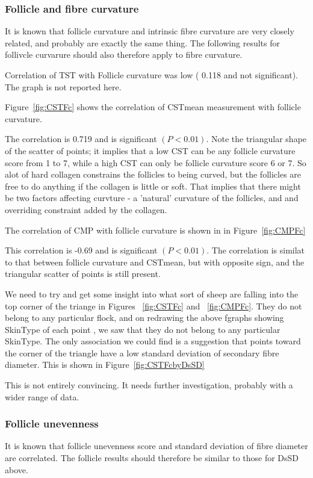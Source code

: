 \documentclass[titlepage]{article}  %
\begin{document}
\subsubsection{Follicle and fibre curvature}
It is known that follicle curvature and intrinsic fibre curvature are very closely related, and probably are exactly the same thing. The following results for follivcle curvarure should also therefore apply to fibre curvature.

Correlation of TST with Follicle curvature was low ( 0.118 and not significant). The graph is not reported here.

Figure~\ref{fig:CSTFc} shows the correlation of CSTmean measurement with follicle curvature. 

The correlation is  0.719 and is significant $(P<0.01)$. Note the triangular shape of the scatter of points; it implies that a low CST can be any follicle curvature score from 1 to 7, while a high CST can only be follicle curvature score 6 or 7. So alot of hard collagen constrains the follicles to being curved, but the follicles are free to do anything if the collagen is little or soft. That implies that there might be two factors affecting curvture - a 'natural' curvature of the follicles, and and overriding constraint added by the collagen. 

The correlation of CMP with follicle curvature is shown in in Figure~\ref{fig:CMPFc}

This correlation is -0.69 and is significant $(P<0.01)$. The correlation is similat to that between follicle curvature and CSTmean, but with opposite sign, and the triangular scatter of points is still present. 

We need to try and get some insight into what sort of sheep are falling into the top corner of the triange in Figures ~\ref{fig:CSTFc} and ~\ref{fig:CMPFc}. They do not belong to any particular flock, and on redrawing the above fgraphs showing SkinType of each point , we saw that they do not belong to any particular SkinType. The only association we could find is a suggestion that points toward the corner of the triangle have a low standard deviation of secondary fibre diameter. This is shown in Figure~\ref{fig:CSTFcbyDsSD}

This is not entirely convincing. It needs further investigation, probably with a wider range of data.

\subsubsection{Follicle unevenness}
It is known that follicle unevenness score and standard deviation of fibre diameter are correlated. The follicle results should therefore be similar to those for DsSD above.
\end{document}
